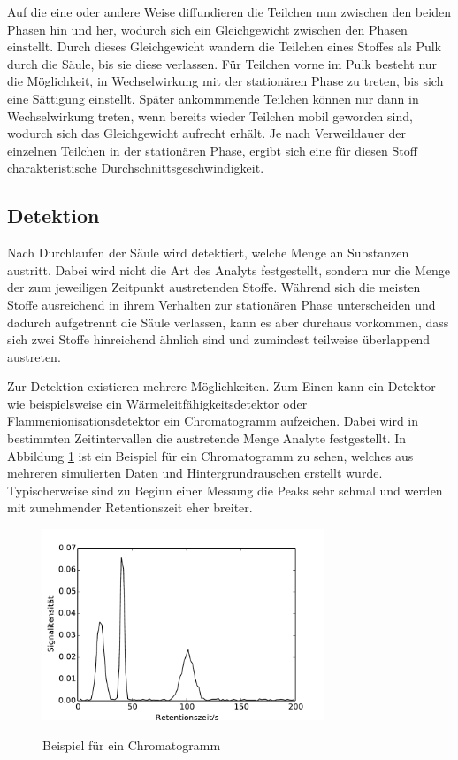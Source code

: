 Auf die eine oder andere Weise diffundieren die Teilchen nun zwischen den beiden Phasen hin und her, wodurch sich ein Gleichgewicht zwischen den Phasen einstellt. Durch dieses Gleichgewicht wandern die Teilchen eines Stoffes als Pulk durch die Säule, bis sie diese verlassen. Für Teilchen vorne im Pulk besteht nur die Möglichkeit, in Wechselwirkung mit der stationären Phase zu treten, bis sich eine Sättigung einstellt. Später ankommmende Teilchen können nur dann in Wechselwirkung treten, wenn bereits wieder Teilchen mobil geworden sind, wodurch sich das Gleichgewicht aufrecht erhält. 
Je nach Verweildauer der einzelnen Teilchen in der stationären Phase, ergibt sich eine für diesen Stoff charakteristische Durchschnittsgeschwindigkeit.%


\subsection{Detektion}
Nach Durchlaufen der Säule wird detektiert, welche Menge an Substanzen austritt. Dabei wird nicht die Art des Analyts festgestellt, sondern nur die Menge der zum jeweiligen Zeitpunkt austretenden Stoffe. Während sich die meisten Stoffe ausreichend in ihrem Verhalten zur stationären Phase unterscheiden und dadurch aufgetrennt die Säule verlassen, kann es aber durchaus vorkommen, dass sich zwei Stoffe hinreichend ähnlich sind und  zumindest teilweise überlappend austreten.

Zur Detektion existieren mehrere Möglichkeiten. Zum Einen kann ein Detektor wie beispielsweise ein Wärmeleitfähigkeitsdetektor oder Flammenionisationsdetektor ein Chromatogramm aufzeichen. Dabei wird in bestimmten Zeitintervallen die austretende Menge Analyte festgestellt. 
In Abbildung \ref{chromatogramm} ist ein Beispiel für ein Chromatogramm zu sehen, welches aus mehreren simulierten Daten und Hintergrundrauschen erstellt wurde.
Typischerweise sind zu Beginn einer Messung die Peaks sehr schmal und werden mit zunehmender Retentionszeit eher breiter.

\begin{figure}
 \centering
  \includegraphics[width = 0.75\textwidth]{bilder/spektrum}\\
  \caption{Beispiel für ein Chromatogramm}
  \label{chromatogramm}
\end{figure}

